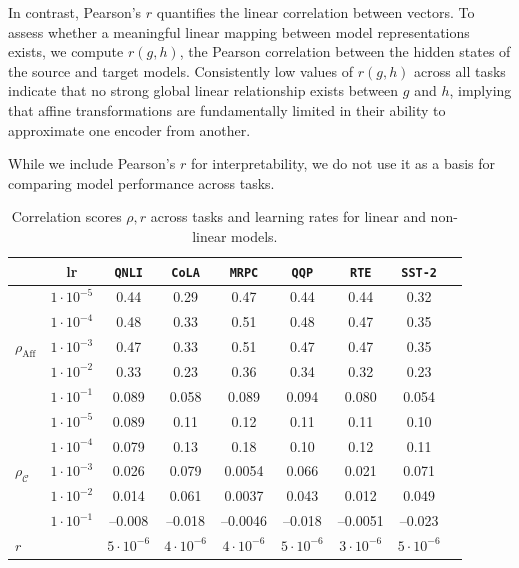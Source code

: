 In contrast, Pearson’s $r$ quantifies the linear correlation between vectors.  
To assess whether a meaningful linear mapping between model representations exists, we compute $r(g, h)$, the Pearson correlation between the hidden states of the source and target models.  
Consistently low values of $r(g, h)$ across all tasks indicate that no strong global linear relationship exists between $g$ and $h$, implying that affine transformations are fundamentally limited in their ability to approximate one encoder from another.


While we include Pearson’s $r$ for interpretability, we do not use it as a basis for comparing model performance across tasks.

\begin{table}[h]
\centering
\caption{Correlation scores \(\rho, r\) across tasks and learning rates for linear and non-linear models.}
\label{tab:correlation-transposed}
\begin{tabular}{l c ccccccc}
\toprule
&\textbf{lr} & \texttt{QNLI} & \texttt{CoLA} & \texttt{MRPC} & \texttt{QQP} & \texttt{RTE} & \texttt{SST-2} \\
\midrule
\multirow{5}{*}{\(\rho_{\mathrm{Aff}}\)} 
& \(1\cdot10^{-5}\) & 0.44 & 0.29 & 0.47 & 0.44 & 0.44 & 0.32 \\
& \(1\cdot10^{-4}\) & 0.48 & 0.33 & 0.51 & 0.48 & 0.47 & 0.35 \\
& \(1\cdot10^{-3}\) & 0.47 & 0.33 & 0.51 & 0.47 & 0.47 & 0.35 \\
& \(1\cdot10^{-2}\) & 0.33 & 0.23 & 0.36 & 0.34 & 0.32 & 0.23 \\
& \(1\cdot10^{-1}\) & 0.089 & 0.058 & 0.089 & 0.094 & 0.080 & 0.054 \\
\midrule
\multirow{5}{*}{\(\rho_{\mathcal{C}}\)} 
& \(1\cdot10^{-5}\) & 0.089 & 0.11 & 0.12 & 0.11 & 0.11 & 0.10 \\
& \(1\cdot10^{-4}\) & 0.079 & 0.13 & 0.18 & 0.10 & 0.12 & 0.11 \\
& \(1\cdot10^{-3}\) & 0.026 & 0.079 & 0.0054 & 0.066 & 0.021 & 0.071 \\
& \(1\cdot10^{-2}\) & 0.014 & 0.061 & 0.0037 & 0.043 & 0.012 & 0.049 \\
& \(1\cdot10^{-1}\) & –0.008 & –0.018 & –0.0046 & –0.018 & –0.0051 & –0.023 \\
\midrule
\(r\) 
& &  \(5\cdot10^{-6}\) & \(4\cdot10^{-6}\) & \(4\cdot10^{-6}\) & \(5\cdot10^{-6}\) & \(3\cdot10^{-6}\) & \(5\cdot10^{-6}\)\\

\end{tabular}
\end{table}

